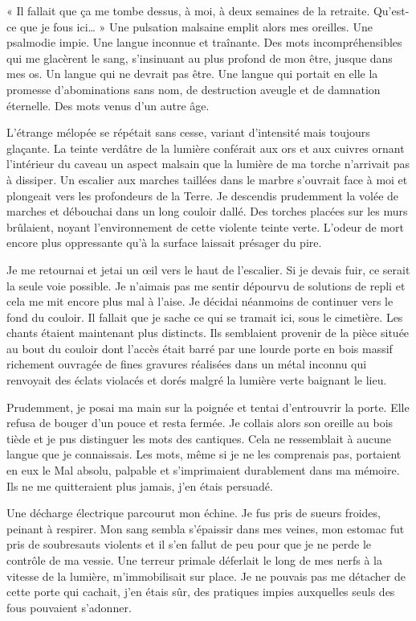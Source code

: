 « Il fallait que ça me tombe dessus, à moi, à deux semaines de la retraite. Qu'est-ce que je fous ici… » Une pulsation 
malsaine emplit alors mes oreilles. Une psalmodie impie. Une langue inconnue et traînante. Des mots incompréhensibles 
qui me glacèrent le sang, s'insinuant au plus profond de mon être, jusque dans mes os. Un langue qui ne devrait pas 
être. Une langue qui portait en elle la promesse d'abominations sans nom, de destruction aveugle et de damnation 
éternelle. Des mots venus d'un autre âge.

L'étrange mélopée se répétait sans cesse, variant d'intensité mais toujours glaçante. La teinte verdâtre de la 
lumière conférait aux ors et aux cuivres ornant l'intérieur du caveau un aspect malsain que la lumière de ma torche 
n'arrivait pas à dissiper. Un escalier aux marches taillées dans le marbre s'ouvrait face à moi et plongeait vers 
les profondeurs de la Terre. Je descendis prudemment la volée de marches et débouchai dans un long couloir dallé. Des 
torches placées sur les murs brûlaient, noyant l'environnement de cette violente teinte verte. L'odeur de mort encore 
plus oppressante qu'à la surface laissait présager du pire.

Je me retournai et jetai un œil vers le haut de l'escalier. Si je devais fuir, ce serait la seule voie possible. Je 
n'aimais pas me sentir dépourvu de solutions de repli et cela me mit encore plus mal à l'aise. Je décidai néanmoins de 
continuer vers le fond du couloir. Il fallait que je sache ce qui se tramait ici, sous le cimetière. Les chants étaient 
maintenant plus distincts. Ils semblaient provenir de la pièce située au bout du couloir dont l'accès était barré par 
une lourde porte en bois massif richement ouvragée de fines gravures réalisées dans un métal inconnu qui renvoyait des 
éclats violacés et dorés malgré la lumière verte baignant le lieu.

Prudemment, je posai ma main sur la poignée et tentai d'entrouvrir la porte. Elle refusa de bouger d'un pouce et 
resta fermée. Je collais alors son oreille au bois tiède et je pus distinguer les mots des cantiques. Cela ne 
ressemblait à aucune langue que je connaissais. Les mots, même si je ne les comprenais pas, portaient en eux le Mal 
absolu, palpable et s'imprimaient durablement dans ma mémoire. Ils ne me quitteraient plus jamais, j'en étais persuadé.

Une décharge électrique parcourut mon échine. Je fus pris de sueurs froides, peinant à respirer. Mon sang sembla 
s'épaissir dans mes veines, mon estomac fut pris de soubresauts violents et il s'en fallut de peu pour que je ne perde 
le contrôle de ma vessie. Une terreur primale déferlait le long de mes nerfs à la vitesse de la lumière, m'immobilisait 
sur place. Je ne pouvais pas me détacher de cette porte qui cachait, j'en étais sûr, des pratiques impies auxquelles 
seuls des fous pouvaient s'adonner.

